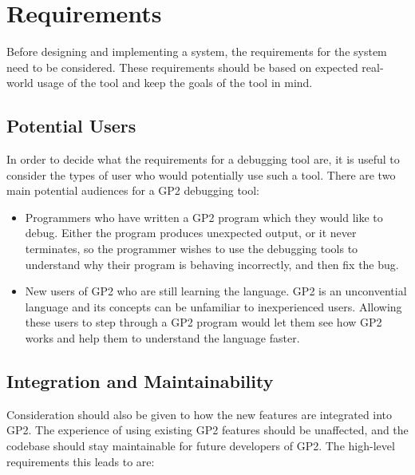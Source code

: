 \documentclass[authoryearcitations]{UoYCSproject}
\begin{document}
\chapter{Requirements}
\label{cha:Requirements}

Before designing and implementing a system, the requirements for the system need
to be considered. These requirements should be based on expected real-world usage
of the tool and keep the goals of the tool in mind.

\section{Potential Users}
\label{sec:Potential Users}

In order to decide what the requirements for a debugging tool are, it is useful
to consider the types of user who would potentially use such a tool. There are
two main potential audiences for a GP2 debugging tool:

\begin{itemize}
    \item Programmers who have written a GP2 program which they would like to
          debug. Either the program produces unexpected output, or it never
          terminates, so the programmer wishes to use the debugging tools to
          understand why their program is behaving incorrectly, and then fix the
          bug.

    \item New users of GP2 who are still learning the language. GP2 is an
          unconvential language and its concepts can be unfamiliar to
          inexperienced users. Allowing these users to step through a GP2
          program would let them see how GP2 works and help them to understand
          the language faster.
\end{itemize}


\section{Integration and Maintainability}
\label{sec:IntegrationAndMaintainability}

Consideration should also be given to how the new features are integrated into
GP2. The experience of using existing GP2 features should be unaffected, and the
codebase should stay maintainable for future developers of GP2. The high-level
requirements this leads to are:
\end{document}

